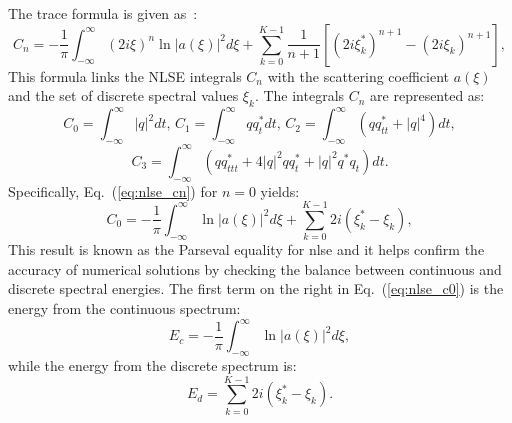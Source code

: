 

The trace formula is given as~\cite{Ablowitz1981}:
\begin{equation}
    C_n = - \frac{1}{\pi} \int_{-\infty}^{\infty} (2i \xi)^n \ln |a(\xi)|^2 d \xi + \sum_{k=0}^{K-1} \frac{1}{n+1} \left[ (2i \xi_k^*)^{n+1} - (2i \xi_k)^{n+1} \right],
    \label{eq:nlse_cn}
\end{equation}
This formula links the NLSE integrals \(C_n\) with the scattering coefficient \(a(\xi)\) and the set of discrete spectral values \(\xi_k\). The integrals \(C_n\) are represented as:
\[
    C_0 = \int_{-\infty}^{\infty} |q|^2 dt, \, C_1 = \int_{-\infty}^{\infty} qq_t^* dt, \, C_2 = \int_{-\infty}^{\infty} (qq_{tt}^* + |q|^4) dt,
\]
\[
    C_3 = \int_{-\infty}^{\infty} (qq^*_{ttt} + 4|q|^2 qq^*_t + |q|^2 q^* q_t) dt.
\]
Specifically, Eq.~(\ref{eq:nlse_cn}) for \(n = 0\) yields:
\begin{equation}
    C_0 = - \frac{1}{\pi} \int_{-\infty}^{\infty} \ln |a(\xi)|^2 d \xi + \sum_{k=0}^{K-1} 2i (\xi_k^* - \xi_k),
    \label{eq:nlse_c0}
\end{equation}
This result is known as the Parseval equality for \acrshort{nlse} and it helps confirm the accuracy of numerical solutions by checking the balance between continuous and discrete spectral energies. The first term on the right in Eq.~(\ref{eq:nlse_c0}) is the energy from the continuous spectrum:
\begin{equation}
    E_c = - \frac{1}{\pi} \int_{-\infty}^{\infty} \ln |a(\xi)|^2 d \xi,
    \label{eq:nlse_e_cont}
\end{equation}
while the energy from the discrete spectrum is:
\begin{equation}
    E_d = \sum_{k=0}^{K-1} 2i (\xi_k^* - \xi_k).
    \label{eq:nlse_e_discr}
\end{equation}



